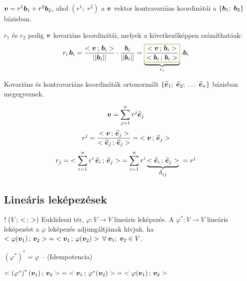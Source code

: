 \documentclass[main.tex]{subfiles}
\begin{document}
\vspace*{1.5em}
$\bm{v} = r^1 \bm{b}_1 + r^2 \bm{b}_2$, ahol
$(r^1 ; \; r^2)$ a $\bm{v}$ vektor kontravariáns koordinátái
a $\left\{ \bm{b}_1 ; \; \bm{b}_2 \right\}$ bázisban.

\vspace*{.5em}
$r_1$ és $r_2$ pedig $\bm{v}$ kovariáns koordinátái,
melyek a következőképpen számíthatóak:
\begin{equation*}
  r_i \, \rvec{b}_i = \frac{
    \scalar{\rvec{v}}{\rvec{b}_i}
  }{\norma{\rvec{b}_i}} \cdot \frac{
    \rvec{b}_i
  }{\norma{\rvec{b}_i}}
  = \underbrace{\rected{$\displaystyle\frac{
          \scalar{\rvec{v}}{\rvec{b}_i}
        }{\scalar{\rvec{b}_i}{\rvec{b}_i}}$}{yellow}}_{r_i}
  \cdot \rvec{b}_i
\end{equation*}



Kovariáns és kontravariáns koordináták ortonormált
$\left\{ \widehat{\bm{e}}_1 ; \; \widehat{\bm{e}}_2 ; \; \dots \; \widehat{\bm{e}}_n \right\}$
bázisban megegyeznek.


\begin{equation*}
  \bm{v} = \sum_{j=1}^n r^j \widehat{\bm{e}}_j
\end{equation*}
\begin{equation*}
  r^j = \dfrac{
    < \bm{v} \, ; \, \widehat{\bm{e}}_j >
  }{
    < \widehat{\bm{e}}_j \, ; \, \widehat{\bm{e}}_j >
  } = \; < \bm{v} \, ; \, \widehat{\bm{e}}_j >
\end{equation*}
\begin{equation*}
  r_j = \; < 
    \sum_{i=1}^n r^i \, \widehat{\bm{e}}_i
   \, ; \, \widehat{\bm{e}}_j > \; = \sum_{i=1}^n r^i \underbrace{
    < \widehat{\bm{e}}_i \, ; \, \widehat{\bm{e}}_j >
  }_{\displaystyle\delta_{ij}} \; = r^j
\end{equation*}

\subsection{Lineáris leképezések}


$! \; (V; \, <  \, ; \,  >)$ Euklideszi tér,
$\varphi: V \rightarrow V$ lineáris leképezés.
A $\varphi^{*} : V \rightarrow V$ lineáris leképezést
a $\varphi$ leképezés adjungáltjának hívjuk. ha
$< \varphi(\bm{v}_1) \, ; \, \bm{v}_2 >
  \; = \; < \bm{v}_1 \, ; \, \varphi(\bm{v}_2) >$
$\forall \; \bm{v}_1 ;\; \bm{v}_2 \in V$.

$\left( \varphi^{*} \right)^{*} = \varphi$
\hspace{2mm} – \hspace{2mm} (Idempotencia)

$< \left( \varphi^{*} \right)^{*}(\bm{v}_1) \, ; \, \bm{v}_2 >
  \; = \; < \bm{v}_1 \, ; \, \varphi^{*}(\bm{v}_2) >
  \; = \; < \varphi(\bm{v}_1) \, ; \, \bm{v}_2 >$
\end{document}
